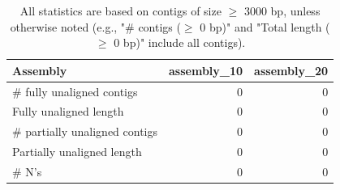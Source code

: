 \documentclass[12pt,a4paper]{article}
\begin{document}
\begin{table}[ht]
\begin{center}
\caption{All statistics are based on contigs of size $\geq$ 3000 bp, unless otherwise noted (e.g., "\# contigs ($\geq$ 0 bp)" and "Total length ($\geq$ 0 bp)" include all contigs).}
\begin{tabular}{|l*{2}{|r}|}
\hline
Assembly & assembly\_10 & assembly\_20 \\ \hline
\# fully unaligned contigs & 0 & 0 \\ \hline
Fully unaligned length & 0 & 0 \\ \hline
\# partially unaligned contigs & 0 & 0 \\ \hline
Partially unaligned length & 0 & 0 \\ \hline
\# N's & 0 & 0 \\ \hline
\end{tabular}
\end{center}
\end{table}
\end{document}
